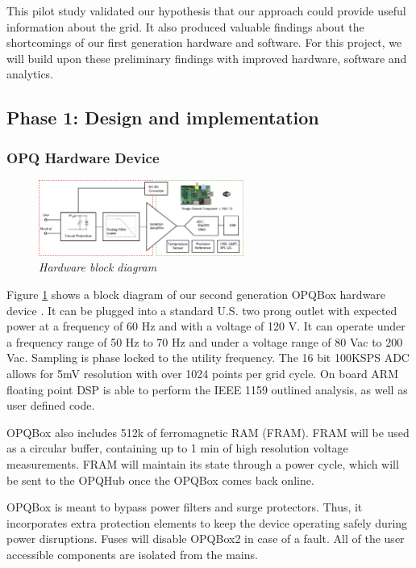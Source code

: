 This pilot study validated our hypothesis that our approach could provide useful information about the grid. It also produced valuable findings about the shortcomings of our first generation hardware and software.  For this project, we will build upon these preliminary findings with improved hardware, software and analytics. 

\subsection{Phase 1: Design and implementation}

\subsubsection{OPQ Hardware Device}

\begin{figure}
  \includegraphics[width=0.6\textwidth]{figures/opq2.eps}
  \caption{\em \small Hardware block diagram}
  \label{fig:hardware-block-diagram}
\end{figure} 

Figure \ref{fig:hardware-block-diagram} shows a block diagram of our second generation OPQBox hardware device \cite{opqbox2}. It can be plugged into a standard U.S. two prong outlet with expected power at a frequency of 60 Hz and with a voltage of 120 V. It can operate under a frequency range of 50 Hz to 70 Hz and under a voltage range of 80 Vac to 200 Vac. Sampling is phase locked to the utility frequency. The 16 bit 100KSPS ADC allows for 5mV resolution with over 1024 points per grid cycle. On board ARM floating point DSP is able to perform the IEEE 1159 outlined analysis, as well as user defined code. 

OPQBox also includes 512k of ferromagnetic RAM (FRAM). FRAM will be used as a circular buffer, containing up to 1 min of high resolution voltage measurements. FRAM will maintain its state through a power cycle, which will be sent to the OPQHub once the OPQBox comes back online.

OPQBox is meant to bypass power filters and surge protectors. Thus, it incorporates extra protection elements to keep the device operating safely during power disruptions. Fuses will disable OPQBox2 in case of a fault. All of the user accessible components are isolated from the mains.

